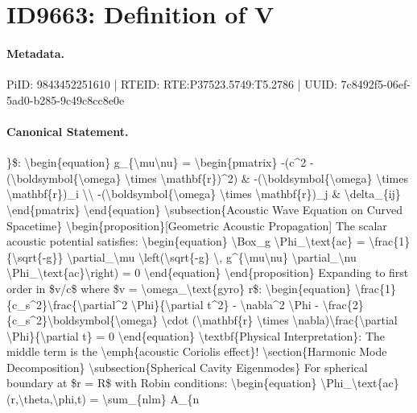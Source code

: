 \section*{ID9663: Definition of V}
\paragraph{Metadata.}
PiID: 9843452251610 | RTEID: RTE:P37523.5749:T5.2786 | UUID: 7c8492f5-06ef-5ad0-b285-9c49c8cc8e0e

\paragraph{Canonical Statement.}
\}\$: \textbackslash{}begin\{equation\} g\_\{\textbackslash{}mu\textbackslash{}nu\} = \textbackslash{}begin\{pmatrix\} -(c\textasciicircum{}2 - (\textbackslash{}boldsymbol\{\textbackslash{}omega\} \textbackslash{}times \textbackslash{}mathbf\{r\})\textasciicircum{}2) \& -(\textbackslash{}boldsymbol\{\textbackslash{}omega\} \textbackslash{}times \textbackslash{}mathbf\{r\})\_i \textbackslash{}\textbackslash{} -(\textbackslash{}boldsymbol\{\textbackslash{}omega\} \textbackslash{}times \textbackslash{}mathbf\{r\})\_j \& \textbackslash{}delta\_\{ij\} \textbackslash{}end\{pmatrix\} \textbackslash{}end\{equation\} \textbackslash{}subsection\{Acoustic Wave Equation on Curved Spacetime\} \textbackslash{}begin\{proposition\}[Geometric Acoustic Propagation] The scalar acoustic potential satisfies: \textbackslash{}begin\{equation\} \textbackslash{}Box\_g \textbackslash{}Phi\_\textbackslash{}text\{ac\} = \textbackslash{}frac\{1\}\{\textbackslash{}sqrt\{-g\}\} \textbackslash{}partial\_\textbackslash{}mu \textbackslash{}left(\textbackslash{}sqrt\{-g\} \textbackslash{}, g\textasciicircum{}\{\textbackslash{}mu\textbackslash{}nu\} \textbackslash{}partial\_\textbackslash{}nu \textbackslash{}Phi\_\textbackslash{}text\{ac\}\textbackslash{}right) = 0 \textbackslash{}end\{equation\} \textbackslash{}end\{proposition\} Expanding to first order in \$v/c\$ where \$v = \textbackslash{}omega\_\textbackslash{}text\{gyro\} r\$: \textbackslash{}begin\{equation\} \textbackslash{}frac\{1\}\{c\_s\textasciicircum{}2\}\textbackslash{}frac\{\textbackslash{}partial\textasciicircum{}2 \textbackslash{}Phi\}\{\textbackslash{}partial t\textasciicircum{}2\} - \textbackslash{}nabla\textasciicircum{}2 \textbackslash{}Phi - \textbackslash{}frac\{2\}\{c\_s\textasciicircum{}2\}\textbackslash{}boldsymbol\{\textbackslash{}omega\} \textbackslash{}cdot (\textbackslash{}mathbf\{r\} \textbackslash{}times \textbackslash{}nabla)\textbackslash{}frac\{\textbackslash{}partial \textbackslash{}Phi\}\{\textbackslash{}partial t\} = 0 \textbackslash{}end\{equation\} \textbackslash{}textbf\{Physical Interpretation\}: The middle term is the \textbackslash{}emph\{acoustic Coriolis effect\}! \textbackslash{}section\{Harmonic Mode Decomposition\} \textbackslash{}subsection\{Spherical Cavity Eigenmodes\} For spherical boundary at \$r = R\$ with Robin conditions: \textbackslash{}begin\{equation\} \textbackslash{}Phi\_\textbackslash{}text\{ac\}(r,\textbackslash{}theta,\textbackslash{}phi,t) = \textbackslash{}sum\_\{nlm\} A\_\{n

